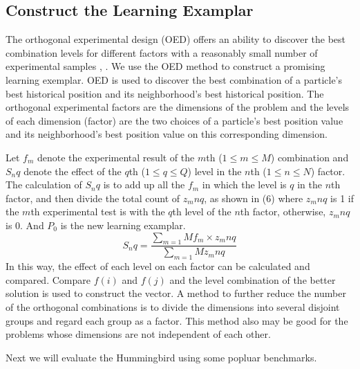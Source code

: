 \subsection{Construct the Learning Examplar}\label{subsec:construct}
\par The orthogonal experimental design (OED) offers an ability to discover the best combination levels for different factors with a reasonably small number of experimental samples \cite{dc2000design}, \cite{beijing}. We use the OED method to construct a promising learning exemplar. OED is used to discover the best combination of a particle’s best historical position and its neighborhood’s best historical position. The orthogonal experimental factors are the dimensions of the problem and the levels of each dimension (factor) are the two choices of a particle’s best position value and its neighborhood’s best position value on this corresponding dimension.
\par Let $f_m$ denote the experimental result of the $m$th ($1\leq m \leq M$) combination and $S_nq $ denote the effect of the $q$th ($1 \leq q \leq Q$) level in the $n$th ($1 \leq n \leq N$) factor. The calculation of $S_nq$ is to add up all the $f_m$ in which the level is $q$ in the $n$th factor, and then divide the total count of $z_mnq $, as shown in (6) where $z_mnq $ is 1 if the $m$th experimental test is with the $q$th level of the $n$th factor, otherwise, $z_mnq $ is 0. And $P_0$ is the new learning examplar.
\begin{equation}
 S_nq = \frac{\sum_{m=1}\nolimits M f_m \times z_mnq}{\sum_{m=1}\nolimits M z_mnq}
\end{equation}
In this way, the effect of each level on each factor can be calculated and compared. Compare $f(i)$ and $f (j)$ and the level combination of the better solution is used to construct the vector. A method to further
reduce the number of the orthogonal combinations is to divide the dimensions into several disjoint groups and regard each group as a factor. This method also may be good for the problems whose dimensions are not independent of each other.

\par Next we will evaluate the Hummingbird using some popluar benchmarks.




